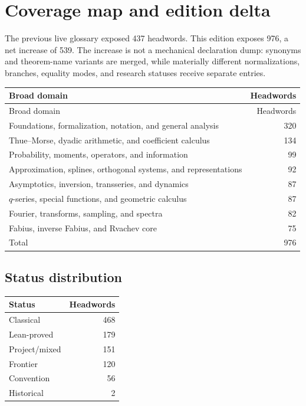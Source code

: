\documentclass[11pt,oneside]{article}
\begin{document}
\section{Coverage map and edition delta}
The previous live glossary exposed 437 headwords.  This edition exposes
976, a net increase of 539.  The increase is not a
mechanical declaration dump: synonyms and theorem-name variants are merged,
while materially different normalizations, branches, equality modes, and
research statuses receive separate entries.
\begingroup\small\renewcommand{\arraystretch}{1.15}
\begin{longtable}{@{}L{0.70\textwidth}r@{}}
\toprule Broad domain & Headwords\\ \midrule\endfirsthead
\toprule Broad domain & Headwords\\ \midrule\endhead
Foundations, formalization, notation, and general analysis & 320 \\
Thue--Morse, dyadic arithmetic, and coefficient calculus & 134 \\
Probability, moments, operators, and information & 99 \\
Approximation, splines, orthogonal systems, and representations & 92 \\
Asymptotics, inversion, transseries, and dynamics & 87 \\
\(q\)-series, special functions, and geometric calculus & 87 \\
Fourier, transforms, sampling, and spectra & 82 \\
Fabius, inverse Fabius, and Rvachev core & 75 \\
\midrule Total & 976\\ \bottomrule\end{longtable}\endgroup
\subsection{Status distribution}
\begingroup\small\renewcommand{\arraystretch}{1.12}
\begin{tabular}{@{}lr@{}}\toprule Status & Headwords\\\midrule
Classical & 468 \\
Lean-proved & 179 \\
Project/mixed & 151 \\
Frontier & 120 \\
Convention & 56 \\
Historical & 2 \\
\bottomrule\end{tabular}\endgroup
\end{document}
